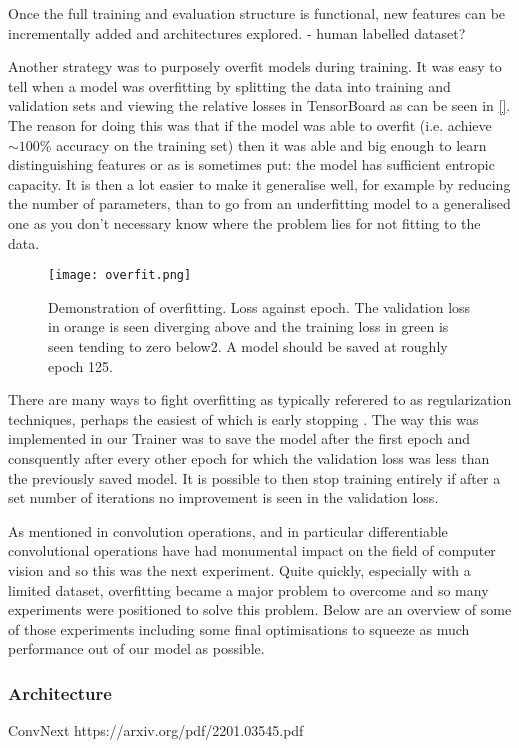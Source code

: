 Once the full training and evaluation structure is functional, new features can be incrementally added and architectures explored.
 - human labelled dataset?

Another strategy was to purposely overfit models during training.  It was easy to tell when a model was overfitting by splitting the data into
training and validation sets \cite{} and viewing the relative losses in TensorBoard as can be seen in \autoref{}.  The reason for doing this
was that if the model was able to overfit (i.e. achieve $\sim100\%$ accuracy on the training set) then it was able and big enough to learn distinguishing features or
as is sometimes put: the model has sufficient entropic capacity.  It is then a lot easier to make it generalise well, for example by reducing the number of parameters, 
than to go from an underfitting model to a generalised one as you don't necessary know where the problem lies for not fitting to the data.

\begin{figure}[h]
    \centering
    \texttt{[image: overfit.png]}
    \caption{Demonstration of overfitting.  Loss against epoch. The validation loss in orange is seen diverging above and the training loss in green is seen tending
    to zero below2.
    A model should be saved at roughly epoch 125.}
    \label{fig:overfit}
\end{figure}

There are many ways to fight overfitting as typically referered to as regularization techniques, perhaps the easiest of which is early stopping \cite{}.
The way this was implemented in our Trainer was to save the model after the first epoch and consquently after every other epoch for which the validation 
loss was less than the previously saved model.  It is possible to then stop training entirely if after a set number of iterations no improvement is seen 
in the validation loss.

As mentioned in  convolution operations, and in particular differentiable convolutional operations have had monumental 
impact on the field of computer vision and so this was the next experiment. Quite quickly, especially with a limited dataset, overfitting 
became a major problem to overcome and so many experiments were positioned to solve this problem.  Below are an overview of some of those 
experiments including some final optimisations to squeeze as much performance out of our model as possible.


\subsubsection{Architecture}
ConvNext https://arxiv.org/pdf/2201.03545.pdf

